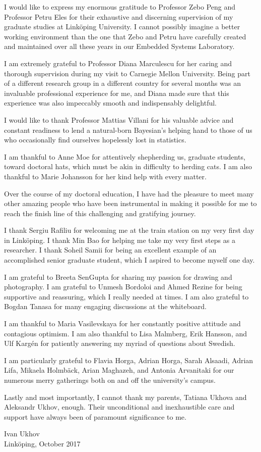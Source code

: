 I would like to express my enormous gratitude to Professor Zebo Peng and
Professor Petru Eles for their exhaustive and discerning supervision of my
graduate studies at Linköping University. I cannot possibly imagine a better
working environment than the one that Zebo and Petru have carefully created and
maintained over all these years in our Embedded Systems Laboratory.

I am extremely grateful to Professor Diana Marculescu for her caring and
thorough supervision during my visit to Carnegie Mellon University. Being part
of a different research group in a different country for several months was an
invaluable professional experience for me, and Diana made sure that this
experience was also impeccably smooth and indispensably delightful.

I would like to thank Professor Mattias Villani for his valuable advice and
constant readiness to lend a natural-born Bayesian's helping hand to those of us
who occasionally find ourselves hopelessly lost in statistics.

I am thankful to Anne Moe for attentively shepherding us, graduate students,
toward doctoral hats, which must be akin in difficulty to herding cats. I am
also thankful to Marie Johansson for her kind help with every matter.

Over the course of my doctoral education, I have had the pleasure to meet many
other amazing people who have been instrumental in making it possible for me to
reach the finish line of this challenging and gratifying journey.

I thank Sergiu Rafiliu for welcoming me at the train station on my very first
day in Linköping. I thank Min Bao for helping me take my very first steps as a
researcher. I thank Soheil Samii for being an excellent example of an
accomplished senior graduate student, which I aspired to become myself one day.

I am grateful to Breeta SenGupta for sharing my passion for drawing and
photography. I am grateful to Unmesh Bordoloi and Ahmed Rezine for being
supportive and reassuring, which I really needed at times. I am also grateful to
Bogdan Tanasa for many engaging discussions at the whiteboard.

I am thankful to Maria Vasilevskaya for her constantly positive attitude and
contagious optimism. I am also thankful to Lisa Malmberg, Erik Hansson, and Ulf
Kargén for patiently answering my myriad of questions about Swedish.

I am particularly grateful to Flavia Horga, Adrian Horga, Sarah Alsaadi, Adrian
Lifa, Mikaela Holmbäck, Arian Maghazeh, and Antonia Arvanitaki for our numerous
merry gatherings both on and off the university's campus.

Lastly and most importantly, I cannot thank my parents, Tatiana Ukhova and
Aleksandr Ukhov, enough. Their unconditional and inexhaustible care and support
have always been of paramount significance to me.

\vspace{4em}
\hfill
\noindent
\begin{minipage}{0.35\textwidth}
  Ivan Ukhov\\
  Linköping, October 2017
\end{minipage}
